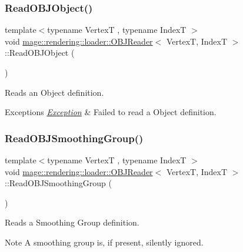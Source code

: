\subsubsection{\texorpdfstring{Read\+O\+B\+J\+Object()}{ReadOBJObject()}}
{\footnotesize\ttfamily template$<$typename VertexT , typename IndexT $>$ \\
void \mbox{\hyperlink{classmage_1_1rendering_1_1loader_1_1_o_b_j_reader}{mage\+::rendering\+::loader\+::\+O\+B\+J\+Reader}}$<$ VertexT, IndexT $>$\+::Read\+O\+B\+J\+Object (\begin{DoxyParamCaption}{ }\end{DoxyParamCaption})\hspace{0.3cm}{\ttfamily [private]}}

Reads an Object definition.


\begin{DoxyExceptions}{Exceptions}
{\em \mbox{\hyperlink{classmage_1_1_exception}{Exception}}} & Failed to read a Object definition. \\
\hline
\end{DoxyExceptions}
\mbox{\label{classmage_1_1rendering_1_1loader_1_1_o_b_j_reader_ac7f3807cf0a0ae24b340cb8208c5b2ef}} 
\subsubsection{\texorpdfstring{Read\+O\+B\+J\+Smoothing\+Group()}{ReadOBJSmoothingGroup()}}
{\footnotesize\ttfamily template$<$typename VertexT , typename IndexT $>$ \\
void \mbox{\hyperlink{classmage_1_1rendering_1_1loader_1_1_o_b_j_reader}{mage\+::rendering\+::loader\+::\+O\+B\+J\+Reader}}$<$ VertexT, IndexT $>$\+::Read\+O\+B\+J\+Smoothing\+Group (\begin{DoxyParamCaption}{ }\end{DoxyParamCaption})\hspace{0.3cm}{\ttfamily [private]}}

Reads a Smoothing Group definition.

\begin{DoxyNote}{Note}
A smoothing group is, if present, silently ignored. 
\end{DoxyNote}

